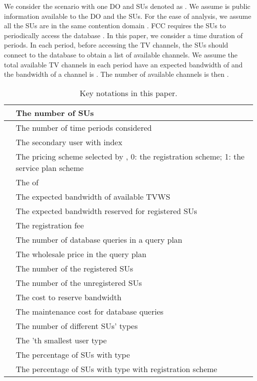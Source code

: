 \documentclass[journal]{IEEEtran}
\begin{document}
We consider the scenario with one DO and  SUs denoted as . We assume  is public information available to the DO and the SUs. For the ease of analysis, we assume all the SUs are in the same contention domain \cite{contention_domain}. FCC requires the SUs to periodically access the database \cite{FCCrule10}. In this paper, we consider a time duration of  periods. In each period, before accessing the TV channels, the SUs should connect to the database to obtain a list of available channels. We assume the total available TV channels in each period have an expected bandwidth of  and the bandwidth of a channel is . The number of available channels is then .

\begin{table}[tp]
\renewcommand{\arraystretch}{1.0}
\caption{Key notations in this paper.}
\label{tab:Notations}
\centering
\begin{tabular}{|c|p{2.8in}|}
  \hline
 & The number of SUs\\
  \hline
   & The number of time periods considered\\
  \hline
   & The secondary user with index \\
  \hline
   & The pricing scheme selected by , 0: the registration scheme; 1: the service plan scheme\\
  \hline
   & The  of \\
  \hline
   & The expected bandwidth of available TVWS\\
  \hline
   & The expected bandwidth reserved for registered SUs\\
  \hline
   & The registration fee\\
  \hline
   & The number of database queries in a query plan \\
  \hline
   & The wholesale price in the query plan \\
  \hline
   & The number of the registered SUs\\
  \hline
   & The number of the unregistered SUs\\
  \hline
   & The cost to reserve  bandwidth\\
  \hline
   & The maintenance cost for  database queries\\
  \hline
   & The number of different SUs' types\\
  \hline
   & The 'th smallest user type\\
  \hline
   & The percentage of SUs with type \\
  \hline
   & The percentage of SUs with type  with registration scheme\\
  \hline
\end{tabular}
\end{table}
\end{document}
